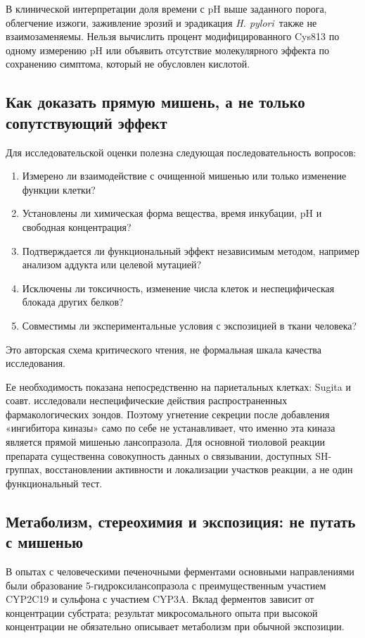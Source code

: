 \documentclass[11pt,a4paper,notitlepage]{report}
\newcommand{\Hp}{\textit{H. pylori}}
\newcommand{\src}[1]{\unskip\space\cite{#1}}
\begin{document}
В клинической интерпретации доля времени с pH выше заданного порога, облегчение изжоги, заживление эрозий и эрадикация \Hp\ также не взаимозаменяемы. Нельзя вычислить процент модифицированного Cys813 по одному измерению pH или объявить отсутствие молекулярного эффекта по сохранению симптома, который не обусловлен кислотой.\src{acggerd,agagerd,acghp}

\subsection{Как доказать прямую мишень, а не только сопутствующий эффект}
Для исследовательской оценки полезна следующая последовательность вопросов:
\begin{enumerate}
\item Измерено ли взаимодействие с очищенной мишенью или только изменение функции клетки?
\item Установлены ли химическая форма вещества, время инкубации, pH и свободная концентрация?
\item Подтверждается ли функциональный эффект независимым методом, например анализом аддукта или целевой мутацией?
\item Исключены ли токсичность, изменение числа клеток и неспецифическая блокада других белков?
\item Совместимы ли экспериментальные условия с экспозицией в ткани человека?
\end{enumerate}
Это авторская схема критического чтения, не формальная шкала качества исследования.

Ее необходимость показана непосредственно на париетальных клетках: Sugita и соавт. исследовали неспецифические действия распространенных фармакологических зондов. Поэтому угнетение секреции после добавления «ингибитора киназы» само по себе не устанавливает, что именно эта киназа является прямой мишенью лансопразола. Для основной тиоловой реакции препарата существенна совокупность данных о связывании, доступных SH-группах, восстановлении активности и локализации участков реакции, а не один функциональный тест.\src{molprobes,molnagaya89,molcys,molrestore}

\subsection{Метаболизм, стереохимия и экспозиция: не путать с мишенью}
\label{sec:metabolism}
В опытах с человеческими печеночными ферментами основными направлениями были образование 5-гидроксилансопразола с преимущественным участием CYP2C19 и сульфона с участием CYP3A. Вклад ферментов зависит от концентрации субстрата; результат микросомального опыта при высокой концентрации не обязательно описывает метаболизм при обычной экспозиции.\src{molp450}
\end{document}
